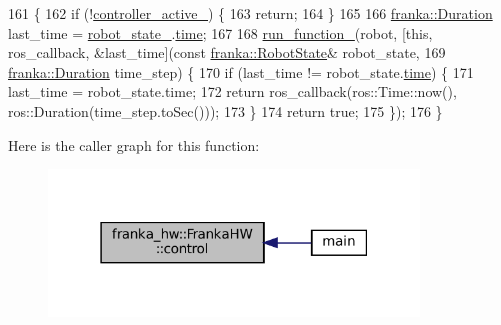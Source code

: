 \begin{DoxyCode}
161                                                                                \{
162   \textcolor{keywordflow}{if} (!\hyperlink{classfranka__hw_1_1FrankaHW_aa207ee4ba133fdb1b3887c9639b47b40}{controller\_active\_}) \{
163     \textcolor{keywordflow}{return};
164   \}
165 
166   \hyperlink{classfranka_1_1Duration}{franka::Duration} last\_time = \hyperlink{classfranka__hw_1_1FrankaHW_a1b9c3149cda8b7d78d52ecea65a8ebab}{robot\_state\_}.\hyperlink{structfranka_1_1RobotState_aabfdabeaef8c1858c52dd32344bdd039}{time};
167 
168   \hyperlink{classfranka__hw_1_1FrankaHW_ab53d17aecdb62936defdcde99e9b88b8}{run\_function\_}(robot, [\textcolor{keyword}{this}, ros\_callback, &last\_time](\textcolor{keyword}{const} 
      \hyperlink{structfranka_1_1RobotState}{franka::RobotState}& robot\_state,
169                                                         \hyperlink{classfranka_1_1Duration}{franka::Duration} time\_step) \{
170     \textcolor{keywordflow}{if} (last\_time != robot\_state.\hyperlink{structfranka_1_1RobotState_aabfdabeaef8c1858c52dd32344bdd039}{time}) \{
171       last\_time = robot\_state.time;
172       return ros\_callback(ros::Time::now(), ros::Duration(time\_step.toSec()));
173     \}
174     \textcolor{keywordflow}{return} \textcolor{keyword}{true};
175   \});
176 \}
\end{DoxyCode}
Here is the caller graph for this function\+:
\nopagebreak
\begin{figure}[H]
\begin{center}
\leavevmode
\includegraphics[width=279pt]{classfranka__hw_1_1FrankaHW_a7b2809eac4702b7a2284e5ea51628139_icgraph}
\end{center}
\end{figure}
\mbox{\label{classfranka__hw_1_1FrankaHW_a4014fbce5bae60ee693505775ecee499}} 
